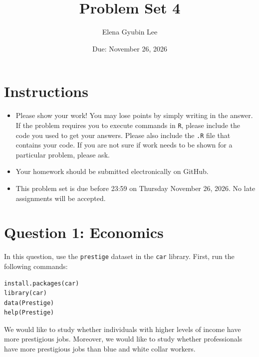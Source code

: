 \documentclass[12pt,letterpaper]{article}
\title{Problem Set 4}
\date{Due: November 26, 2026}
\author{Elena Gyubin Lee}
\begin{document}
	\maketitle
	\section*{Instructions}
	\begin{itemize}
		\item Please show your work! You may lose points by simply writing in the answer. If the problem requires you to execute commands in \texttt{R}, please include the code you used to get your answers. Please also include the \texttt{.R} file that contains your code. If you are not sure if work needs to be shown for a particular problem, please ask.
		\item Your homework should be submitted electronically on GitHub.
		\item This problem set is due before 23:59 on Thursday November 26, 2026. No late assignments will be accepted.
	\end{itemize}



	\vspace{.5cm}
\section*{Question 1: Economics}
\vspace{.25cm}
\noindent 	
In this question, use the \texttt{prestige} dataset in the \texttt{car} library. First, run the following commands:

\begin{verbatim}
install.packages(car)
library(car)
data(Prestige)
help(Prestige)
\end{verbatim} 


\noindent We would like to study whether individuals with higher levels of income have more prestigious jobs. Moreover, we would like to study whether professionals have more prestigious jobs than blue and white collar workers.
\end{document}

